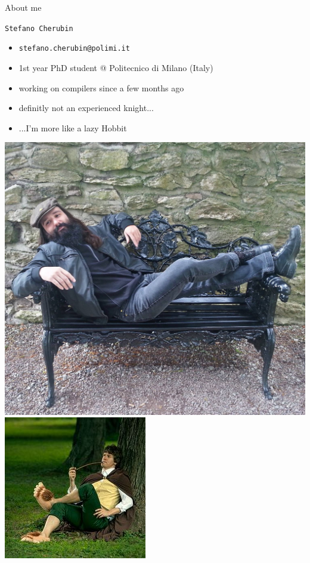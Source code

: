 \documentclass[10pt,mathserif]{beamer}
\begin{document}
\begin{frame}[t]{About me}
  \begin{huge}
    \texttt{Stefano Cherubin}
  \end{huge}
  \begin{itemize}
    \item \texttt{stefano.cherubin@polimi.it}
    \item 1st year PhD student @ Politecnico di Milano (Italy)
    \item working on compilers since a few months ago
    \item definitly not an experienced knight...
    \pause
    \item ...I'm more like a lazy Hobbit
  \end{itemize}
  \begin{center}
    \includegraphics[height=.35\textheight]{img/00/lazy_hobbit.jpg}
    \hspace{.1\textwidth}
    \includegraphics[height=.35\textheight]{img/00/lazy_hobbit_2.jpg}
  \end{center}
\end{frame}
\end{document}
